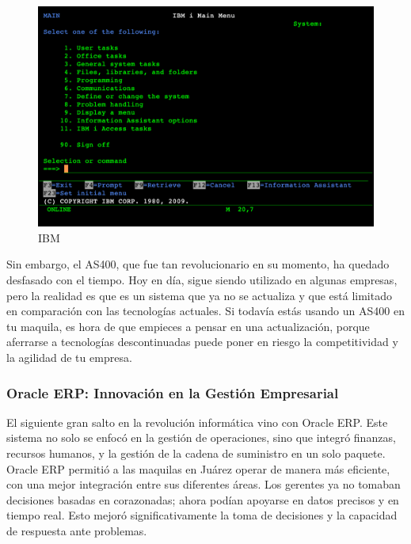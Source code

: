 \documentclass[
  10pt,
  letterpaper,
]{book}
\begin{document}
\begin{figure}[H]

{\centering \includegraphics{Img/ibm.png}

}

\caption{IBM}

\end{figure}%

Sin embargo, el AS400, que fue tan revolucionario en su momento, ha
quedado desfasado con el tiempo. Hoy en día, sigue siendo utilizado en
algunas empresas, pero la realidad es que es un sistema que ya no se
actualiza y que está limitado en comparación con las tecnologías
actuales. Si todavía estás usando un AS400 en tu maquila, es hora de que
empieces a pensar en una actualización, porque aferrarse a tecnologías
descontinuadas puede poner en riesgo la competitividad y la agilidad de
tu empresa.

\subsubsection{Oracle ERP: Innovación en la Gestión
Empresarial}\label{oracle-erp-innovaciuxf3n-en-la-gestiuxf3n-empresarial}

El siguiente gran salto en la revolución informática vino con Oracle
ERP. Este sistema no solo se enfocó en la gestión de operaciones, sino
que integró finanzas, recursos humanos, y la gestión de la cadena de
suministro en un solo paquete. Oracle ERP permitió a las maquilas en
Juárez operar de manera más eficiente, con una mejor integración entre
sus diferentes áreas. Los gerentes ya no tomaban decisiones basadas en
corazonadas; ahora podían apoyarse en datos precisos y en tiempo real.
Esto mejoró significativamente la toma de decisiones y la capacidad de
respuesta ante problemas.
\end{document}
